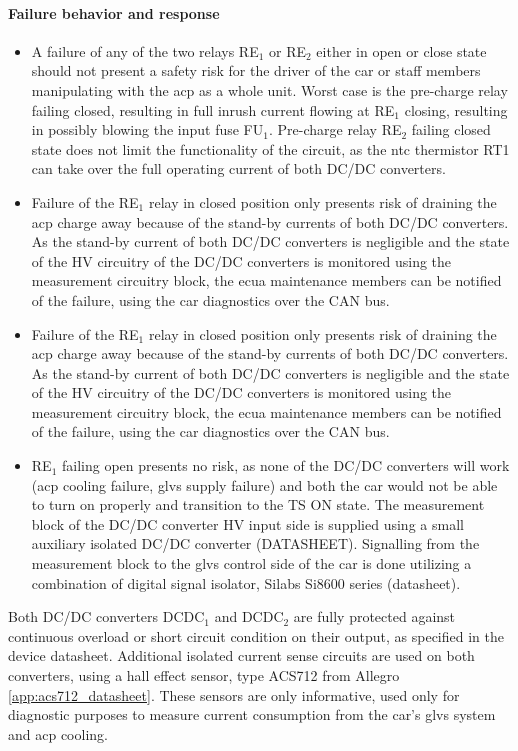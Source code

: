 \paragraph{Failure behavior and response}
\begin{itemize}
	\item A failure of any of the two relays RE$_1$ or RE$_2$ either in open or close state should not present a safety risk for the driver of the car or staff members manipulating with the \gls{acp} as a whole unit. 
	Worst case is the pre-charge relay failing closed, resulting in full inrush current flowing at RE$_1$ closing, resulting in possibly blowing the input fuse FU$_1$. Pre-charge relay RE$_2$ failing closed state does not limit the functionality of the circuit, as the \gls{ntc} thermistor RT1 can take over the full operating current of both DC/DC converters.
	\item Failure of the RE$_1$ relay in closed position only presents risk of draining the \gls{acp} charge away because of the stand-by currents of both DC/DC converters. As the stand-by current of both DC/DC converters is negligible and the state of the HV circuitry of the DC/DC converters is monitored using the measurement circuitry block, the \gls{ecua} maintenance members can be notified of the failure, using the car diagnostics over the CAN bus.
	\item Failure of the RE$_1$ relay in closed position only presents risk of draining the \gls{acp} charge away because of the stand-by currents of both DC/DC converters. As the stand-by current of both DC/DC converters is negligible and the state of the HV circuitry of the DC/DC converters is monitored using the measurement circuitry block, the \gls{ecua} maintenance members can be notified of the failure, using the car diagnostics over the CAN bus. 
	\item RE$_1$ failing open presents no risk, as none of the DC/DC converters will work (\gls{acp} cooling failure, \gls{glvs} supply failure) and both the car would not be able to turn on properly and transition to the TS ON state.
	The measurement block of the DC/DC converter HV input side is supplied using a small auxiliary isolated DC/DC converter (DATASHEET). Signalling from the measurement block to the \gls{glvs} control side of the car is done utilizing a combination of digital signal isolator, Silabs Si8600 series (datasheet).
\end{itemize}


Both DC/DC converters DCDC$_1$ and DCDC$_2$ are fully protected against continuous overload or short circuit condition on their output, as specified in the device datasheet. Additional isolated current sense circuits are used on both converters, using a hall effect sensor, type ACS712 from Allegro \ref{app:acs712_datasheet}. These sensors are only informative, used only for diagnostic purposes to measure current consumption from the car's \gls{glvs} system and \gls{acp} cooling.

